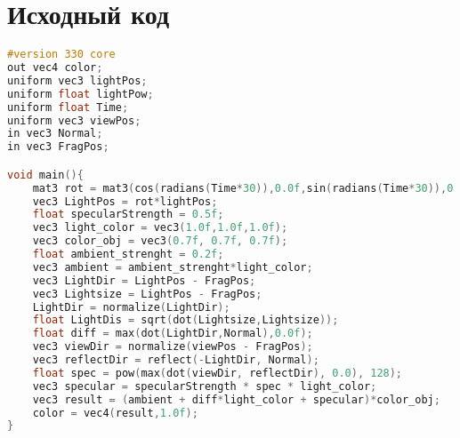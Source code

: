 \section{Исходный код}

\begin{lstlisting}[language=C]
#version 330 core
out vec4 color;
uniform vec3 lightPos;
uniform float lightPow;
uniform float Time;
uniform vec3 viewPos;
in vec3 Normal;
in vec3 FragPos;

void main(){
    mat3 rot = mat3(cos(radians(Time*30)),0.0f,sin(radians(Time*30)),0.0f,1.0f,0.0f,-sin(radians(Time*30)),0.0f,cos(radians(Time*30)));
    vec3 LightPos = rot*lightPos;
    float specularStrength = 0.5f;
    vec3 light_color = vec3(1.0f,1.0f,1.0f);
    vec3 color_obj = vec3(0.7f, 0.7f, 0.7f);
    float ambient_strenght = 0.2f;
    vec3 ambient = ambient_strenght*light_color;
    vec3 LightDir = LightPos - FragPos;
    vec3 Lightsize = LightPos - FragPos;
    LightDir = normalize(LightDir);
    float LightDis = sqrt(dot(Lightsize,Lightsize));
    float diff = max(dot(LightDir,Normal),0.0f);
    vec3 viewDir = normalize(viewPos - FragPos);
    vec3 reflectDir = reflect(-LightDir, Normal);
    float spec = pow(max(dot(viewDir, reflectDir), 0.0), 128);
    vec3 specular = specularStrength * spec * light_color;
    vec3 result = (ambient + diff*light_color + specular)*color_obj;
    color = vec4(result,1.0f);
}
\end{lstlisting}




